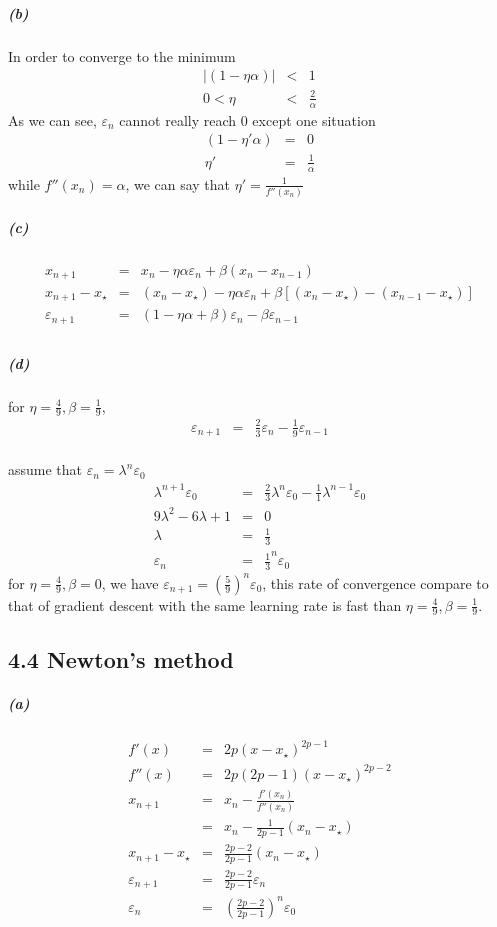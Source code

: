 \documentclass{article}
\begin{document}
\subparagraph*{(b)}
In order to converge to the minimum
\begin{eqnarray*}
|(1-\eta\alpha)| &<& 1\\
 0 < \eta &<& \frac{2}{\alpha}
\end{eqnarray*}
As we can see, $\varepsilon_n$ cannot really reach 0 except one situation
\begin{eqnarray*}
	(1-\eta'\alpha) &=& 0\\
	\eta' &=& \frac{1}{\alpha}
\end{eqnarray*} 
while $f''(x_n) = \alpha$, we can say that $\eta' = \frac{1}{f''(x_n)}$
\subparagraph*{(c)}
\begin{eqnarray*}
	x_{n+1} &=& x_n - \eta \alpha \varepsilon_n + \beta(x_n - x_{n-1})\\
	x_{n+1}-x_{\star} &=& (x_n - x_{\star}) - \eta \alpha \varepsilon_n + \beta[(x_n-x_{\star}) - (x_{n-1}-x_{\star})]\\
	\varepsilon_{n+1} &=& (1-\eta\alpha + \beta)\varepsilon_n - \beta \varepsilon_{n-1}\\
\end{eqnarray*}

\subparagraph*{(d)}
for $\eta = \frac{4}{9}, \beta = \frac{1}{9}$,
\begin{eqnarray*}
	\varepsilon_{n+1} &=& \frac{2}{3}\varepsilon_n - \frac{1}{9} \varepsilon_{n-1}\\
\end{eqnarray*}

assume that $\varepsilon_n = \lambda^n \varepsilon_0$
\begin{eqnarray*}
	\lambda^{n+1} \varepsilon_0 &=& \frac{2}{3}\lambda^n\varepsilon_0 - \frac{1}{1} \lambda^{n-1} \varepsilon_0\\
	9\lambda^2 - 6\lambda + 1 &=& 0\\
	\lambda &=& \frac{1}{3}\\
	\varepsilon_n &=& \frac{1}{3}^n \varepsilon_0
\end{eqnarray*}
for $\eta = \frac{4}{9}, \beta = 0$, we have $\varepsilon_{n+1} = \left(\frac{5}{9}\right)^n\varepsilon_0$, this rate of convergence compare to that of gradient descent with the
same learning rate is fast than $\eta = \frac{4}{9}, \beta = \frac{1}{9}$.

\subsection*{4.4 Newton’s method}
\subparagraph*{(a)}
\begin{eqnarray*}
	f'(x)&=&2p(x-x_{\star})^{2p-1}\\
	f''(x)&=&2p(2p-1)(x-x_{\star})^{2p-2}\\
	x_{n+1}&=& x_{n} - \frac{f'(x_n)}{f''(x_n)}\\
	&=&x_n - \frac{1}{2p-1}(x_n-x_{\star})\\
	x_{n+1} - x_{\star} &=&   \frac{2p-2}{2p-1} (x_{n} - x_{\star})\\
	\varepsilon_{n+1} &=& \frac{2p-2}{2p-1} \varepsilon_n\\
	\varepsilon_n &=& \left(\frac{2p-2}{2p-1}\right)^n \varepsilon_0
\end{eqnarray*}
\end{document}
